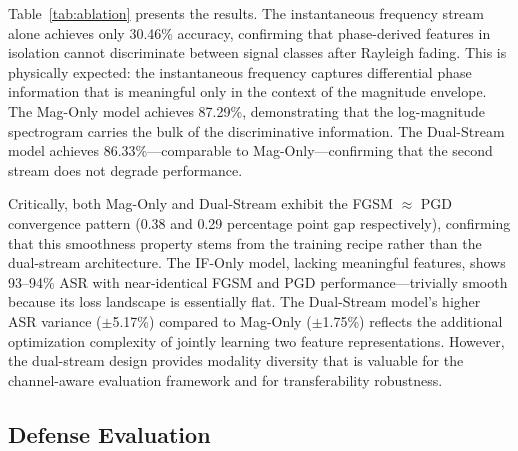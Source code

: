 \documentclass[conference]{IEEEtran}
\begin{document}
\begin{table}[t]
\centering
\caption{Ablation: Stream Contribution (3-Seed Mean $\pm$ Std)}\label{tab:ablation}
\end{table}

Table~\ref{tab:ablation} presents the results. The instantaneous frequency stream alone achieves only 30.46\% accuracy, confirming that phase-derived features in isolation cannot discriminate between signal classes after Rayleigh fading. This is physically expected: the instantaneous frequency captures differential phase information that is meaningful only in the context of the magnitude envelope. The Mag-Only model achieves 87.29\%, demonstrating that the log-magnitude spectrogram carries the bulk of the discriminative information. The Dual-Stream model achieves 86.33\%---comparable to Mag-Only---confirming that the second stream does not degrade performance.

Critically, both Mag-Only and Dual-Stream exhibit the FGSM $\approx$ PGD convergence pattern (0.38 and 0.29 percentage point gap respectively), confirming that this smoothness property stems from the training recipe rather than the dual-stream architecture. The IF-Only model, lacking meaningful features, shows 93--94\% ASR with near-identical FGSM and PGD performance---trivially smooth because its loss landscape is essentially flat. The Dual-Stream model's higher ASR variance ($\pm$5.17\%) compared to Mag-Only ($\pm$1.75\%) reflects the additional optimization complexity of jointly learning two feature representations. However, the dual-stream design provides modality diversity that is valuable for the channel-aware evaluation framework and for transferability robustness.

\subsection{Defense Evaluation}
\end{document}
